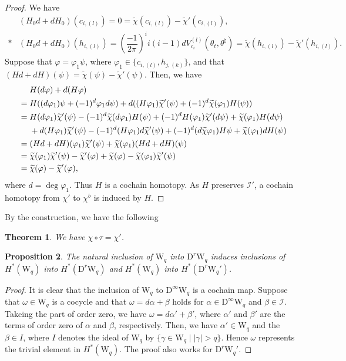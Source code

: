 \documentclass[12pt]{amsart}
\newcommand{\W}{\mathrm{W}}
\newcommand{\D}{\mathrm{D}}
\newcommand{\norm}[1]{\lvert#1\rvert}
\newtheorem{theorem}{Theorem}[section]
\newtheorem{proposition}[theorem]{Proposition}
\theoremstyle{definition}
\theoremstyle{remark}
\begin{document}
\begin{proof}
We have
\begin{align*}
&(H_0d+dH_0)(c_{i,(l)})=0=\widetilde{\chi}(c_{i,(l)})-\widetilde{\chi}'(c_{i,(l)}),\\*
&(H_0d+dH_0)(h_{i,(l)})=\left(\dfrac{-1}{2\pi}\right)^ii(i-1)dV^{(l)}_{c_i}(\theta_t,\theta^\natural)%
=\widetilde\chi(h_{i,(l)})-\widetilde\chi'(h_{i,(l)}).
\end{align*}
Suppose that $\varphi=\varphi_1\psi$, where $\varphi_1\in\{c_{i,(l)},h_{j,(k)}\}$, and that $(Hd+dH)(\psi)=\widetilde\chi(\psi)-\widetilde\chi'(\psi)$.
Then, we have
\begin{align*}
&\hphantom{{}={}}%
H(d\varphi)+d(H\varphi)\\*
&=H((d\varphi_1)\psi+(-1)^d\varphi_1d\psi)+d((H\varphi_1)\widetilde\chi'(\psi)+(-1)^d\widetilde\chi(\varphi_1)H(\psi))\\*
&=\begin{aligned}[t]%
&H(d\varphi_1)\widetilde\chi'(\psi)-(-1)^d\widetilde\chi(d\varphi_1)H(\psi)+(-1)^dH(\varphi_1)\widetilde\chi'(d\psi)+\widetilde\chi(\varphi_1)H(d\psi)\\*
&+d(H\varphi_1)\widetilde\chi'(\psi)-(-1)^d(H\varphi_1)d\widetilde\chi'(\psi)+(-1)^d(d\widetilde\chi\varphi_1)H\psi+\widetilde\chi(\varphi_1)dH(\psi)
\end{aligned}\\*
&=(Hd+dH)(\varphi_1)\widetilde\chi'(\psi)+\widetilde\chi(\varphi_1)(Hd+dH)(\psi)\\*
&=\widetilde\chi(\varphi_1)\widetilde\chi'(\psi)-\widetilde\chi'(\varphi)+\widetilde\chi(\varphi)-\widetilde\chi(\varphi_1)\widetilde\chi'(\psi)\\*
&=\widetilde\chi(\varphi)-\widetilde\chi'(\varphi),
\end{align*}
where $d=\deg\varphi_1$.
Thus $H$ is a cochain homotopy.
As $H$ preserves $\mathscr{I}'$, a cochain homotopy from $\chi'$ to $\chi^b$ is induced by $H$.
\end{proof}

By the construction, we have the following
\begin{theorem}
We have $\chi\circ\tau=\chi'$.
\end{theorem}

\begin{proposition}
The natural inclusion of\/ $\W_q$ into $\D^r\W_q$ induces inclusions of $H^*(\W_q)$ into $H^*(\D^r\W_q)$ and $H^*(\W_q)$ into $H^*(\D^r\W_q')$.
\end{proposition}
\begin{proof}
It is clear that the inclusion of $\W_q$ to $\D^\infty\W_q$ is a cochain map.
Suppose that $\omega\in\W_q$ is a cocycle and that $\omega=d\alpha+\beta$ holds for $\alpha\in\D^\infty\W_q$ and $\beta\in\mathscr{I}$.
Takeing the part of order zero, we have $\omega=d\alpha'+\beta'$, where $\alpha'$ and $\beta'$ are the terms of order zero of $\alpha$ and $\beta$, respectively.
Then, we have $\alpha'\in\W_q$ and the $\beta\in I$, where $I$ denotes the ideal of $\W_q$ by $\{\gamma\in\W_q\mid\norm{\gamma}>q\}$.
Hence $\omega$ represents the trivial element in $H^*(\W_q)$.
The proof also works for $\D^r\W_q'$.
\end{proof}
\end{document}

